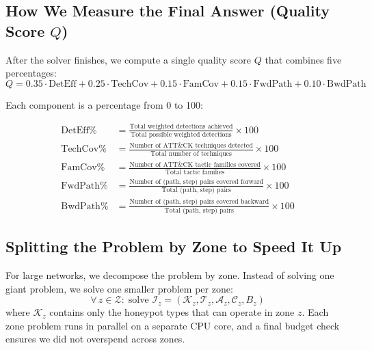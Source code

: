 \documentclass[journal]{IEEEtran}
\newcommand{\calK}{\mathcal{K}}
\newcommand{\calT}{\mathcal{T}}
\newcommand{\calA}{\mathcal{A}}
\newcommand{\calZ}{\mathcal{Z}}
\newcommand{\calC}{\mathcal{C}}
\begin{document}
\subsection{How We Measure the Final Answer (Quality Score $Q$)}

After the solver finishes, we compute a single quality score $Q$
that combines five percentages:
\begin{equation}
  Q = 0.35\cdot\text{DetEff} + 0.25\cdot\text{TechCov}
    + 0.15\cdot\text{FamCov} + 0.15\cdot\text{FwdPath}
    + 0.10\cdot\text{BwdPath}
\end{equation}

Each component is a percentage from 0 to 100:

\begin{align}
  \text{DetEff}\%   &= \frac{\text{Total weighted detections achieved}}
                             {\text{Total possible weighted detections}} \times 100 \\[4pt]
  \text{TechCov}\%  &= \frac{\text{Number of ATT\&CK techniques detected}}
                             {\text{Total number of techniques}} \times 100 \\[4pt]
  \text{FamCov}\%   &= \frac{\text{Number of ATT\&CK tactic families covered}}
                             {\text{Total tactic families}} \times 100 \\[4pt]
  \text{FwdPath}\%  &= \frac{\text{Number of (path, step) pairs covered forward}}
                             {\text{Total (path, step) pairs}} \times 100 \\[4pt]
  \text{BwdPath}\%  &= \frac{\text{Number of (path, step) pairs covered backward}}
                             {\text{Total (path, step) pairs}} \times 100
\end{align}

\subsection{Splitting the Problem by Zone to Speed It Up}

For large networks, we decompose the problem by zone. Instead of
solving one giant problem, we solve one smaller problem per zone:
\begin{equation}
  \forall\, z \in \calZ:\;
  \text{solve } \mathcal{I}_z = (\calK_z, \calT_z, \calA_z, \calC_z, B_z)
\end{equation}
where $\calK_z$ contains only the honeypot types that can operate
in zone $z$. Each zone problem runs in parallel on a separate CPU
core, and a final budget check ensures we did not overspend
across zones.
\end{document}
